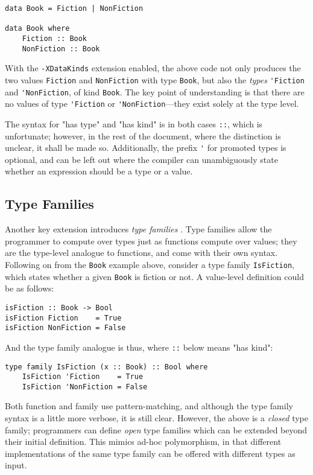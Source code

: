 \documentclass[12pt, a4paper, bibliography=totocnumbered]{scrreprt}
\newcommand{\inline}[1]{\lstinline[basicstyle=\ttfamily\footnotesize]{#1}}
\begin{document}
\begin{lstlisting}
data Book = Fiction | NonFiction

data Book where
    Fiction :: Book
    NonFiction :: Book
\end{lstlisting}

With the \inline{-XDataKinds} extension enabled, the above code not only produces the two values \inline{Fiction} and \inline{NonFiction} with type \inline{Book}, but also the \emph{types} \inline{'Fiction} and \inline{'NonFiction}, of kind \inline{Book}. The key point of understanding is that there are no values of type \inline{'Fiction} or \inline{'NonFiction}---they exist solely at the type level.

The syntax for "has type" and "has kind" is in both cases \inline{::}, which is unfortunate; however, in the rest of the document, where the distinction is unclear, it shall be made so. Additionally, the prefix \inline{'} for promoted types is optional, and can be left out where the compiler can unambiguously state whether an expression should be a type or a value.

\subsection{Type Families}

Another key extension introduces \emph{type families} \cite{opentfs} \cite{closedtfs}. Type families allow the programmer to compute over types just as functions compute over values; they are the type-level analogue to functions, and come with their own syntax. Following on from the \inline{Book} example above, consider a type family \inline{IsFiction}, which states whether a given \inline{Book} is fiction or not. A value-level definition could be as follows:

\begin{lstlisting}
isFiction :: Book -> Bool
isFiction Fiction    = True
isFiction NonFiction = False
\end{lstlisting}

And the type family analogue is thus, where \inline{::} below means "has kind":

\begin{lstlisting}
type family IsFiction (x :: Book) :: Bool where
    IsFiction 'Fiction    = True
    IsFiction 'NonFiction = False
\end{lstlisting}

Both function and family use pattern-matching, and although the type family syntax is a little more verbose, it is still clear. However, the above is a \emph{closed} type family; programmers can define \emph{open} type families which can be extended beyond their initial definition. This mimics ad-hoc polymorphism, in that different implementations of the same type family can be offered with different types as input.
\end{document}
